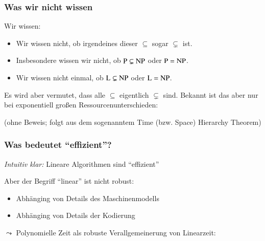 \documentclass[onlymath]{beamer}
\begin{document}
\begin{frame}\frametitle{Was wir nicht wissen}

Wir wissen:

\theobox{
\[\Scomplclass{L}\subseteq\Scomplclass{NL}\subseteq \Scomplclass{P}\subseteq\Scomplclass{NP}\subseteq\Scomplclass{PSpace}= \Scomplclass{NPSpace}\subseteq \Scomplclass{Exp}\subseteq \Scomplclass{NExp}\]
\vspace{-2.5ex}
}

\begin{itemize}
\item Wir wissen nicht, ob irgendeines dieser $\subseteq$ sogar $\subsetneq$ ist.
\item Insbesondere wissen wir nicht, ob ${\textsc{P}}\subsetneq{\textsc{NP}}$ oder ${\textsc{P}}={\textsc{NP}}$.
\item Wir wissen nicht einmal, ob ${\textsc{L}}\subsetneq{\textsc{NP}}$ oder ${\textsc{L}}={\textsc{NP}}$.
\end{itemize}\pause
Es wird aber vermutet, dass alle  $\subseteq$ eigentlich $\subsetneq$ sind.
% 
Bekannt ist das aber nur bei exponentiell großen Ressourcenunterschieden:


(ohne Beweis; folgt aus dem sogenanntem \alert{Time (bzw. Space) Hierarchy Theorem})

\end{frame}



\begin{frame}\frametitle{Was bedeutet "`effizient"'?}

\emph{Intuitiv klar:} Lineare Algorithmen sind "`effizient"'
\bigskip\pause

Aber der Begriff "`linear"' ist nicht robust:
\begin{itemize}
\item Abhänging von Details des Maschinenmodells
\item Abhänging von Details der Kodierung
\end{itemize}
\bigskip
$\leadsto$ Polynomielle Zeit als robuste Verallgemeinerung von Linearzeit:\bigskip

%

\end{frame}
\end{document}
